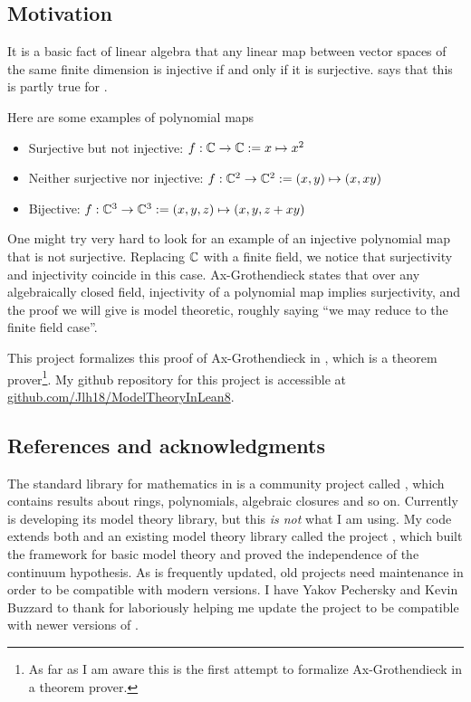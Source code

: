 \subsection*{Motivation}

It is a basic fact of linear algebra that any linear map
between vector spaces of the same finite dimension is
injective if and only if it is surjective.
 says that this is
partly true for .

Here are some examples of polynomial maps
\begin{itemize}
  \item Surjective but not injective: $f : \mathbb{C} \to \mathbb{C} := x \mapsto x^{2}$
  \item Neither surjective nor injective:
      $f : \mathbb{C}^{2} \to \mathbb{C}^{2} := (x,y) \mapsto (x,xy)$
  \item Bijective:
      $f : \mathbb{C}^{3} \to \mathbb{C}^{3} := (x,y,z) \mapsto ( x , y , z + xy )$
\end{itemize}

One might try very hard to look for an example of an injective polynomial map
that is not surjective.
Replacing $\mathbb{C}$ with a finite field, we notice that
surjectivity and injectivity coincide in this case.
Ax-Grothendieck states that over any algebraically closed field,
injectivity of a polynomial map implies surjectivity,
and the proof we will give is model theoretic,
roughly saying ``we may reduce to the finite field case''.

This project formalizes this proof of Ax-Grothendieck in
\href{https://leanprover.github.io/}{},
which is a theorem prover\footnote{
  As far as I am aware this is the first attempt to formalize Ax-Grothendieck in
  a theorem prover. }.
My github repository for this project is accessible at
\url{github.com/Jlh18/ModelTheoryInLean8}.

\subsection*{References and acknowledgments}

The standard library for mathematics in  is a community project called
,
which contains results about rings, polynomials, algebraic closures and so on.
Currently  is developing its model theory library,
but this \textit{is not} what I am using.
My  code extends both  and an existing model theory library
called the  project \cite{flypitch},
which built the framework for basic model theory and proved the
independence of the continuum hypothesis.
As  is frequently updated,
old projects need maintenance in order to be compatible with modern versions.
I have Yakov Pechersky and Kevin Buzzard to thank for laboriously helping me
update the  project to be compatible with newer versions of .

